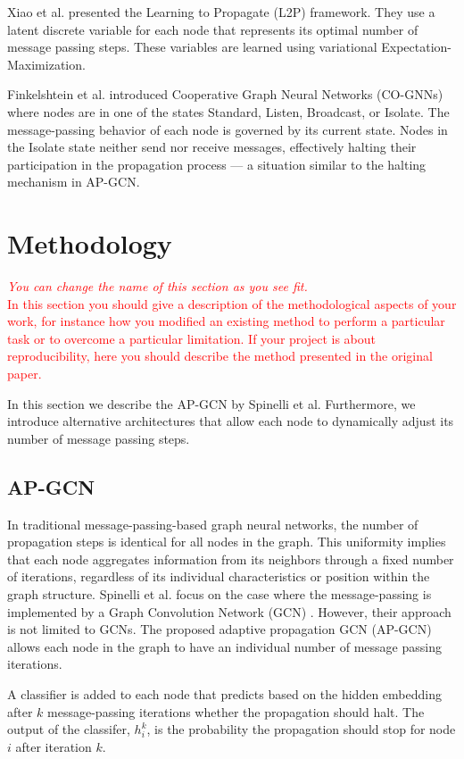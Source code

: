 \documentclass{gdl}
\begin{document}
Xiao et al. \cite{xiao2021} presented the Learning to Propagate (L2P) framework. They use a latent discrete variable for each node that represents its optimal number of message passing steps. These variables are learned using variational Expectation-Maximization.

Finkelshtein et al. \cite{finkelshtein2024} introduced Cooperative Graph Neural Networks (CO-GNNs) where nodes are in one of the states Standard, Listen, Broadcast, or Isolate. The message-passing behavior of each node is governed by its current state. Nodes in the Isolate state neither send nor receive messages, effectively halting their participation in the propagation process — a situation similar to the halting mechanism in AP-GCN.

\section{Methodology}

\textcolor{red}{
\textit{You can change the name of this section as you see fit.}\\
In this section you should give a description of the methodological aspects of your work, for instance how you modified an existing method to perform a particular task or to overcome a particular limitation. If your project is about reproducibility, here you should describe the method presented in the original paper.}

In this section we describe the AP-GCN by Spinelli et al. Furthermore, we introduce alternative architectures that allow each node to dynamically adjust its number of message passing steps.

\subsection{AP-GCN}
In traditional message-passing-based graph neural networks, the number of propagation steps is identical for all nodes in the graph. This uniformity implies that each node aggregates information from its neighbors through a fixed number of iterations, regardless of its individual characteristics or position within the graph structure. Spinelli et al. focus on the case where the message-passing is implemented by a Graph Convolution Network (GCN) \cite{kipf2017}. However, their approach is not limited to GCNs. The proposed adaptive propagation GCN (AP-GCN) allows each node in the graph to have an individual number of message passing iterations. 

A classifier is added to each node that predicts based on the hidden embedding after $k$ message-passing iterations whether the propagation should halt. The output of the classifer, $h^k_i$, is the probability the propagation should stop for node $i$ after iteration $k$.
\end{document}
